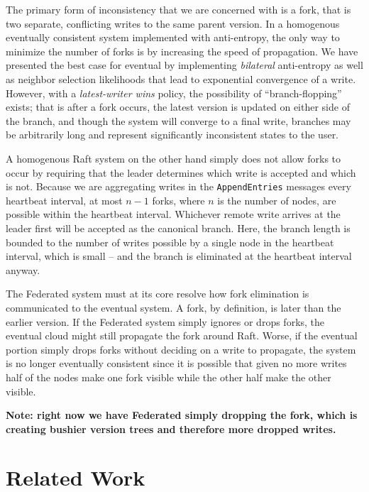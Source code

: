 \documentclass[10pt,conference,letterpaper]{IEEEtran}
\begin{document}
The primary form of inconsistency that we are concerned with is a fork, that is two separate, conflicting writes to the same parent version. In a homogenous eventually consistent system implemented with anti-entropy, the only way to minimize the number of forks is by increasing the speed of propagation. We have presented the best case for eventual by implementing \textit{bilateral} anti-entropy as well as neighbor selection likelihoods that lead to exponential convergence of a write. However, with a \textit{latest-writer wins} policy, the possibility of ``branch-flopping'' exists; that is after a fork occurs, the latest version is updated on either side of the branch, and though the system will converge to a final write, branches may be arbitrarily long and represent significantly inconsistent states to the user.

A homogenous Raft system on the other hand simply does not allow forks to occur by requiring that the leader determines which write is accepted and which is not. Because we are aggregating writes in the \texttt{AppendEntries} messages every heartbeat interval, at most $n-1$ forks, where $n$ is the number of nodes, are possible within the heartbeat interval. Whichever remote write arrives at the leader first will be accepted as the canonical branch. Here, the branch length is bounded to the number of writes possible by a single node in the heartbeat interval, which is small -- and the branch is eliminated at the heartbeat interval anyway.

The Federated system must at its core resolve how fork elimination is communicated to the eventual system. A fork, by definition, is later than the earlier version. If the Federated system simply ignores or drops forks, the eventual cloud might still propagate the fork around Raft. Worse, if the eventual portion simply drops forks without deciding on a write to propagate, the system is no longer eventually consistent since it is possible that given no more writes half of the nodes make one fork visible while the other half make the other visible.

\textbf{Note: right now we have Federated simply dropping the fork, which is creating bushier version trees and therefore more dropped writes.}

\section{Related Work}
\end{document}
